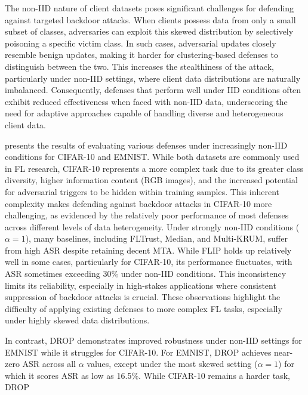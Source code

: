 \label{sec:non_iid} The non-IID nature of client datasets poses significant challenges for defending against targeted backdoor attacks. When clients possess data from only a small subset of classes, adversaries can exploit this skewed distribution by selectively poisoning a specific victim class. In such cases, adversarial updates closely resemble benign updates, making it harder for clustering-based defenses to distinguish between the two. This increases the stealthiness of the attack, particularly under non-IID settings, where client data distributions are naturally imbalanced. Consequently, defenses that perform well under IID conditions often exhibit reduced effectiveness when faced with non-IID data, underscoring the need for adaptive approaches capable of handling diverse and heterogeneous client data.

 presents the results of evaluating various defenses under increasingly non-IID conditions for CIFAR-10 and EMNIST. While both datasets are commonly used in FL research, CIFAR-10 represents a more complex task due to its greater class diversity, higher information content (RGB images), and the increased potential for adversarial triggers to be hidden within training samples. This inherent complexity makes defending against backdoor attacks in CIFAR-10 more challenging, as evidenced by the relatively poor performance of most defenses across different levels of data heterogeneity. Under strongly non-IID conditions (\(\alpha = 1\)), many baselines, including FLTrust, Median, and Multi-KRUM, suffer from high ASR despite retaining decent MTA. While FLIP holds up relatively well in some cases, particularly for CIFAR-10, its performance fluctuates, with ASR sometimes exceeding 30\% under non-IID conditions. This inconsistency limits its reliability, especially in high-stakes applications where consistent suppression of backdoor attacks is crucial. These observations highlight the difficulty of applying existing defenses to more complex FL tasks, especially under highly skewed data distributions.  

In contrast, DROP demonstrates improved robustness under non-IID settings for EMNIST while it struggles for CIFAR-10. For EMNIST, DROP achieves near-zero ASR across all \(\alpha\) values, except under the most skewed setting (\(\alpha = 1\)) for which it scores ASR as low as 16.5\%. While CIFAR-10 remains a harder task, DROP 



